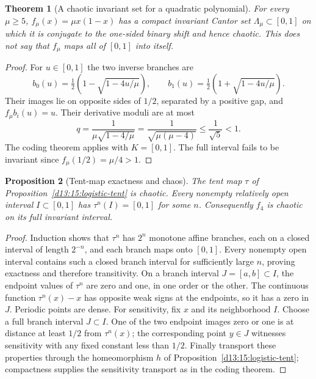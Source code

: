 \documentclass[11pt,oneside]{book}
\newtheorem{theorem}{Theorem}[chapter]
\newtheorem{proposition}[theorem]{Proposition}
\theoremstyle{definition}
\theoremstyle{remark}\newtheorem{remark}[theorem]{Remark}
\begin{document}
\begin{theorem}[A chaotic invariant set for a quadratic polynomial]\label{d13:17:logistic-cantor}
For every \(\mu\geq5\), \(f_\mu(x)=\mu x(1-x)\) has a compact invariant
Cantor set \(\Lambda_\mu\subset[0,1]\) on which it is conjugate to
the one-sided binary shift and hence chaotic.
This does not say that \(f_\mu\) maps all of \([0,1]\) into itself.
\end{theorem}
\begin{proof}
For \(u\in[0,1]\) the two inverse branches are
\[
 b_0(u)=\tfrac12(1-\sqrt{1-4u/\mu}),\qquad
 b_1(u)=\tfrac12(1+\sqrt{1-4u/\mu}).
\]
Their images lie on opposite sides of \(1/2\), separated by a
positive gap, and \(f_\mu b_i(u)=u\). Their derivative moduli are
at most
\[
 q=\frac1{\mu\sqrt{1-4/\mu}}
   =\frac1{\sqrt{\mu(\mu-4)}}\leq\frac1{\sqrt5}<1.
\]
The coding theorem applies with \(K=[0,1]\).
The full interval fails to be invariant since \(f_\mu(1/2)=\mu/4>1\).
\end{proof}

\begin{proposition}[Tent-map exactness and chaos]\label{d13:17:tent-chaos}
The tent map \(\tau\) of Proposition~\ref{d13:15:logistic-tent} is
chaotic. Every nonempty relatively open interval \(I\subset[0,1]\)
has \(\tau^n(I)=[0,1]\) for some \(n\). Consequently \(f_4\) is
chaotic on its full invariant interval.
\end{proposition}
\begin{proof}
Induction shows that \(\tau^n\) has \(2^n\) monotone affine branches,
each on a closed interval of length \(2^{-n}\), and each branch
maps onto \([0,1]\). Every nonempty open interval contains such a
closed branch interval for sufficiently large \(n\), proving exactness
and therefore transitivity.
On a branch interval \(J=[a,b]\subset I\), the endpoint values of
\(\tau^n\) are zero and one, in one order or the other.
The continuous function \(\tau^n(x)-x\) has opposite weak signs at
the endpoints, so it has a zero in \(J\). Periodic points are dense.
For sensitivity, fix \(x\) and its neighborhood \(I\). Choose a
full branch interval \(J\subset I\). One of the two endpoint images
zero or one is at distance at least \(1/2\) from \(\tau^n(x)\);
the corresponding point \(y\in J\) witnesses sensitivity with any
fixed constant less than \(1/2\). Finally transport these properties
through the homeomorphism \(h\) of
Proposition~\ref{d13:15:logistic-tent}; compactness supplies the
sensitivity transport as in the coding theorem.
\end{proof}
\end{document}

